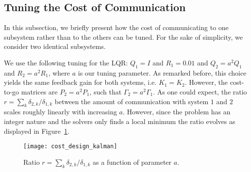\documentclass[letterpaper, 10 pt, conference]{ieeeconf}  %
\newcommand {\matr}[2]{\left[\begin{array}{#1}#2\end{array}\right]}
\newcommand{\todo}[1]{
	\begin{center}
		\fcolorbox{wheat}{wheat}{\parbox[t]{0.9\linewidth}{\textbf{ToDo:} #1}}
	\end{center}}
\begin{document}


\subsection{Tuning the Cost of Communication}

In this subsection, we briefly present how the cost of communicating to one subsystem rather than to the others can be tuned. For the sake of simplicity, we consider two identical subsystems.

We use the following tuning for the LQR: $Q_1=I$ and $R_1=0.01$ and $Q_2=a^2Q_1$ and $R_2=a^2R_1$, where $a$ is our tuning parameter. As remarked before, this choice yields the same feedback gain for both systems, i.e. $K_1=K_2$. However, the cost-to-go matrices are $P_2=a^2P_1$, such that $\Gamma_2=a^2\Gamma_1$. As one could expect, the ratio $r=\sum_k \delta_{2,k}/\delta_{1,k}$ between the amount of communication with system $1$ and $2$ scales roughly linearly with increasing $a$. However, since the problem has an integer nature and the solvers only finds a local minimum the ratio evolves as displayed in Figure~\ref{fig:tuning}.


\begin{figure}
	\begin{center}
		\texttt{[image: cost\_design\_kalman]}
		\caption{Ratio $r=\sum_k \delta_{2,k}/\delta_{1,k}$ as a function of parameter $a$.}
		\label{fig:tuning}
	\end{center}
\end{figure}

\end{document}
